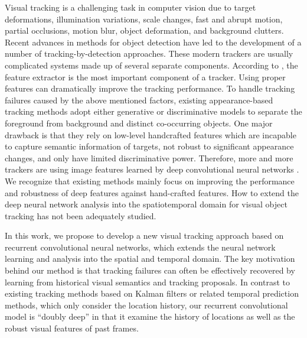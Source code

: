 \documentclass{article}
\begin{document}
Visual tracking is a challenging task in computer vision due to target deformations, illumination variations, scale changes,  fast and abrupt motion, partial occlusions, motion blur, object deformation, and background clutters.
Recent advances in methods for object detection \citep{girshick2015fast, ren2015faster} have led to the development of a number of tracking-by-detection \citep{wang2016stct, hall2014categories, hong2015tracking} approaches. These modern trackers are usually complicated systems made up of several separate components. According to \citep{wang2015understanding}, the feature extractor is the most important component of a tracker. Using proper features can dramatically improve the tracking performance. 
To handle tracking failures caused by the above mentioned factors, existing appearance-based tracking methods \citep{dinh2011context, kalal2010pn, henriques2012exploiting} adopt either generative or discriminative models to separate the foreground from background and distinct co-occurring objects. One major drawback is that they rely on low-level handcrafted features which are incapable to capture semantic information of targets, not robust to significant appearance changes, and only have limited discriminative power.
Therefore, more and more trackers are using image features learned by deep convolutional  neural networks \citep{Wang_2015_ICCV, hong2015tracking, wang2013learning}. 
We recognize that existing methods mainly focus on  improving the performance and robustness of deep features against hand-crafted features. How to extend the deep neural network analysis into the spatiotemporal domain for visual object tracking has not been adequately studied. 

In this work, we propose to develop a new  visual tracking approach based on recurrent convolutional neural networks,  which extends the neural network learning and analysis into the spatial and temporal domain. The key motivation behind our method is  that tracking failures can often be effectively recovered by learning from historical visual semantics and tracking proposals. 
In contrast to existing tracking methods based on Kalman filters or related temporal prediction methods, which only consider
the location history, our recurrent convolutional model is “doubly deep” in that it examine the history of locations as well as the robust visual features of past frames.  
\end{document}
